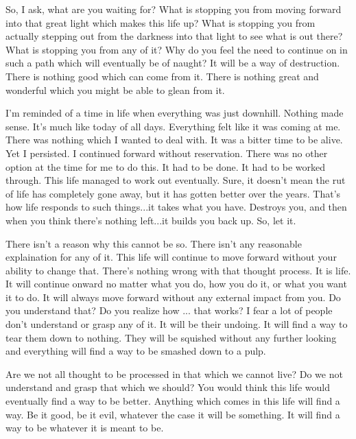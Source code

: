 So, I ask, what are you waiting for? What is stopping you from moving forward
into that great light which makes this life up? What is stopping you from
actually stepping out from the darkness into that light to see what is out
there? What is stopping you from any of it? Why do you feel the need to continue
on in such a path which will eventually be of naught? It will be a way of
destruction. There is nothing good which can come from it. There is nothing
great and wonderful which you might be able to glean from it.

I'm reminded of a time in life when everything was just downhill. Nothing made
sense. It's much like today of all days. Everything felt like it was coming at
me. There was nothing which I wanted to deal with. It was a bitter time to be
alive. Yet I persisted. I continued forward without reservation. There was no
other option at the time for me to do this. It had to be done. It had to be
worked through. This life managed to work out eventually. Sure, it doesn't mean
the rut of life has completely gone away, but it has gotten better over the
years. That's how life responds to such things...it takes what you have.
Destroys you, and then when you think there's nothing left...it builds you back
up. So, let it.

There isn't a reason why this cannot be so. There isn't any reasonable
explaination for any of it. This life will continue to move forward without your
ability to change that. There's nothing wrong with that thought process. It is
life. It will continue onward no matter what you do, how you do it, or what you
want it to do. It will always move forward without any external impact from you.
Do you understand that? Do you realize how ... that works? I fear a lot of
people don't understand or grasp any of it. It will be their undoing. It will
find a way to tear them down to nothing. They will be squished without any
further looking and everything will find a way to be smashed down to a pulp.

Are we not all thought to be processed in that which we cannot live? Do we not
understand and grasp that which we should? You would think this life would
eventually find a way to be better. Anything which comes in this life will find
a way. Be it good, be it evil, whatever the case it will be something. It will
find a way to be whatever it is meant to be.